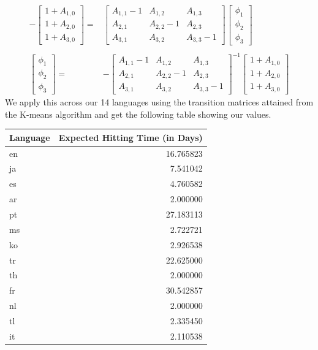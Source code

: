 \documentclass[12pt]{article}
\begin{document}
\begin{align*}
    -\begin{bmatrix}1+A_{1,0} \\ 1+A_{2,0} \\ 1+A_{3,0}\end{bmatrix} =& \begin{bmatrix} A_{1,1} - 1 & A_{1,2} & A_{1,3} \\ A_{2,1} & A_{2,2} - 1 & A_{2,3} \\ A_{3,1} & A_{3,2} & A_{3,3} - 1 \end{bmatrix} \begin{bmatrix} \phi_1 \\ \phi_2 \\ \phi_3 \end{bmatrix}\\\\
     \begin{bmatrix} \phi_1 \\ \phi_2 \\ \phi_3 \end{bmatrix} =& -\begin{bmatrix} A_{1,1} - 1 & A_{1,2} & A_{1,3} \\ A_{2,1} & A_{2,2} - 1 & A_{2,3} \\ A_{3,1} & A_{3,2} & A_{3,3} - 1 \end{bmatrix}^{-1} \begin{bmatrix}1+A_{1,0} \\ 1+A_{2,0} \\ 1+A_{3,0}\end{bmatrix}
\end{align*}
We apply this across our 14 languages using the transition matrices attained from the K-means algorithm and get the following table showing our values.
\FloatBarrier
\begin{table}[hbtp]
\begin{center}
\begin{tabular}{lr}
\toprule
Language &  Expected Hitting Time (in Days) \\
\midrule
en       &    16.765823 \\
ja       &     7.541042 \\
es       &     4.760582 \\
ar       &     2.000000 \\
pt       &    27.183113 \\
ms       &     2.722721 \\
ko       &     2.926538 \\
tr       &    22.625000 \\
th       &     2.000000 \\
fr       &    30.542857 \\
nl       &     2.000000 \\
tl       &     2.335450 \\
it       &     2.110538 \\
\bottomrule
\end{tabular}
\end{center}
\end{table}
\end{document}
